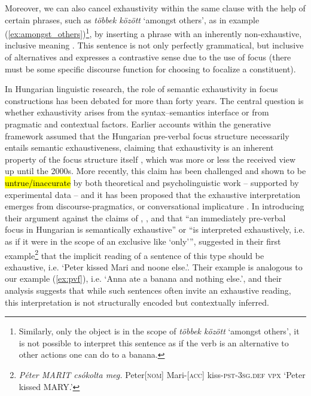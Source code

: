 \documentclass[a4paper, ruler]{CUP-JNL-LIN}%
\begin{document}
Moreover, we can also cancel exhaustivity within the same clause with the help of certain phrases, such as \textit{többek között} `amongst others', as in example (\ref{ex:amongst_others})\footnote{Similarly, only the object is in the scope of \textit{többek között} `amongst others', it is not possible to interpret this sentence as if the verb is an alternative to other actions one can do to a banana.}, by inserting a phrase with an inherently non-exhaustive, inclusive meaning \citep[see also][14]{wedgwood_2006_predication,balogh_2013_hungarian}. This sentence is not only perfectly grammatical, but inclusive of alternatives and expresses a contrastive sense due to the use of focus (there must be some specific discourse function for choosing to focalize a constituent). 



In Hungarian linguistic research, the role of semantic exhaustivity in focus constructions has been debated for more than forty years. The central question is whether exhaustivity arises from the syntax–semantics interface or from pragmatic and contextual factors. Earlier accounts within the generative framework assumed that the Hungarian pre-verbal focus structure necessarily entails semantic exhaustiveness, claiming that exhaustivity is an inherent property of the focus structure itself \citep{szabolcsi_1981_compositionality,ekiss_1998_identificational,ekiss_2007_topic,kenesei_2006_focus,horvath_2008_separating}, which was more or less  the received view up until the 2000s. More recently, this claim has been challenged and shown to be \hl{untrue/inaccurate} by both theoretical and psycholinguistic work -- supported by experimental data -- and it has been proposed that the exhaustive interpretation emerges from discourse-pragmatics, or conversational implicature \citep{wedgwood_2006_hungarian,onea_2009_exhaustiveness,balogh_2013_hungarian,kaldi_2016_magyar}. In introducing their argument against the claims of \citet{szabolcsi_1981_compositionality}, \citet{ekiss_1998_identificational,ekiss_2007_topic}, and \citet{horvath_2008_separating} that \enquote{an immediately pre-verbal focus in Hungarian is semantically exhaustive} or \enquote{is interpreted exhaustively, i.e. as if it were in the scope of an exclusive like \enquote{only}}, \citet[1]{onea_2009_hungarian} suggested in their first example\footnote{\textit{Péter MARIT csókolta meg.} Peter\textsc{[nom]} Mari-[\textsc{acc}] kiss-\textsc{pst-3sg.def} \textsc{vpx} `Peter kissed MARY.'} that the implicit reading of a sentence of this type should be exhaustive, i.e. `Peter kissed Mari and noone else.'. Their example is analogous to our example (\ref{ex:pvf}), i.e. `Anna ate a banana and nothing else.', and their analysis suggests that while such sentences often invite an exhaustive reading, this interpretation is not structurally encoded but contextually inferred.
\end{document}

